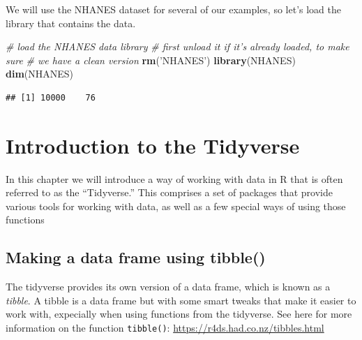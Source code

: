 \documentclass[12pt,]{book}
\newenvironment{Shaded}{\begin{snugshade}}{\end{snugshade}}
\newcommand{\CommentTok}[1]{\textcolor[rgb]{0.56,0.35,0.01}{\textit{#1}}}
\newcommand{\KeywordTok}[1]{\textcolor[rgb]{0.13,0.29,0.53}{\textbf{#1}}}
\newcommand{\NormalTok}[1]{#1}
\newcommand{\StringTok}[1]{\textcolor[rgb]{0.31,0.60,0.02}{#1}}
\begin{document}
We will use the NHANES dataset for several of our examples, so let's load the library that contains the data.

\begin{Shaded}
\begin{Highlighting}[]
\CommentTok{# load the NHANES data library}
\CommentTok{# first unload it if it's already loaded, to make sure}
\CommentTok{# we have a clean version}
\KeywordTok{rm}\NormalTok{(}\StringTok{'NHANES'}\NormalTok{)}
\KeywordTok{library}\NormalTok{(NHANES)}
\KeywordTok{dim}\NormalTok{(NHANES)}
\end{Highlighting}
\end{Shaded}

\begin{verbatim}
## [1] 10000    76
\end{verbatim}

\hypertarget{introduction-to-the-tidyverse}{%
\section{Introduction to the Tidyverse}\label{introduction-to-the-tidyverse}}

In this chapter we will introduce a way of working with data in R that is often referred to as the ``Tidyverse.'' This comprises a set of packages that provide various tools for working with data, as well as a few special ways of using those functions

\hypertarget{making-a-data-frame-using-tibble}{%
\subsection{Making a data frame using tibble()}\label{making-a-data-frame-using-tibble}}

The tidyverse provides its own version of a data frame, which is known as a \emph{tibble}. A tibble is a data frame but with some smart tweaks that make it easier to work with, expecially when using functions from the tidyverse. See here for more information on the function \texttt{tibble()}: \url{https://r4ds.had.co.nz/tibbles.html}
\end{document}
